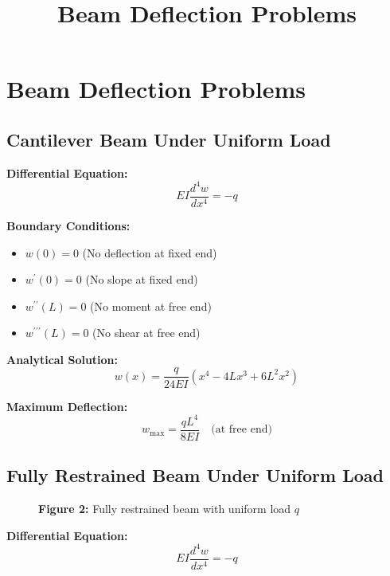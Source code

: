 \documentclass[12pt]{article}
\title{Beam Deflection Problems}
\author{}
\date{}
\begin{document}
\maketitle

\section{Beam Deflection Problems}
\subsection{Cantilever Beam Under Uniform Load}

\textbf{Differential Equation:}
\begin{equation}\tag{1}
EI\frac{d^{4}w}{dx^{4}} = -q
\end{equation}

\textbf{Boundary Conditions:}
\begin{itemize}
    \item $w(0) = 0$ (No deflection at fixed end)
    \item $w^{\prime}(0) = 0$ (No slope at fixed end)
    \item $w^{\prime\prime}(L) = 0$ (No moment at free end)
    \item $w^{\prime\prime\prime}(L) = 0$ (No shear at free end)
\end{itemize}

\textbf{Analytical Solution:}
\begin{equation}\tag{2}
w(x) = \frac{q}{24EI}\left(x^{4} - 4Lx^{3} + 6L^{2}x^{2}\right)
\end{equation}

\textbf{Maximum Deflection:}
\begin{equation}\tag{3}
w_{\max} = \frac{qL^{4}}{8EI} \quad \text{(at free end)}
\end{equation}

\subsection{Fully Restrained Beam Under Uniform Load}

\begin{figure}[h]
\centering
\textbf{Figure 2:} Fully restrained beam with uniform load $q$
\end{figure}

\textbf{Differential Equation:}
\begin{equation}\tag{4}
EI\frac{d^{4}w}{dx^{4}} = -q
\end{equation}
\end{document}
